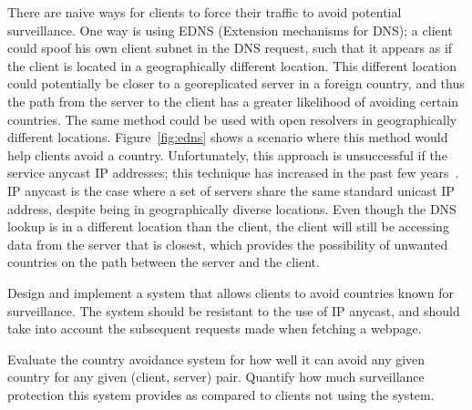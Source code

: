 There are naive ways for clients to force their traffic to avoid potential surveillance.  One way is using EDNS (Extension mechanisms for DNS); a client could spoof his own client subnet in the DNS request, such that it appears as if the client is located in a geographically different location.  This different location could potentially be closer to a georeplicated server in a foreign country, and thus the path from the server to the client has a greater likelihood of avoiding certain countries.  The same method could be used with open resolvers in geographically different locations.  Figure~\ref{fig:edns} shows a scenario where this method would help clients avoid a country.    Unfortunately, this approach is unsuccessful if the service anycast IP addresses; this technique has increased in the past few years~\cite{cicalese2015characterizing}.  IP anycast is the case where a set of servers share the same standard unicast IP address, despite being in geographically diverse locations.  Even though the DNS lookup is in a different location than the client, the client will still be accessing data from the server that is closest, which provides the possibility of unwanted countries on the path between the server and the client.  

\begin{thm}
Design and implement a system that allows clients to avoid countries known for surveillance.  The system should be resistant to the use of IP anycast, and should take into account the subsequent requests made when fetching a webpage.
\end{thm}

\begin{thm}
Evaluate the country avoidance system for how well it can avoid any given country for any given (client, server) pair.  Quantify how much surveillance protection this system provides as compared to clients not using the system.
\end{thm}
